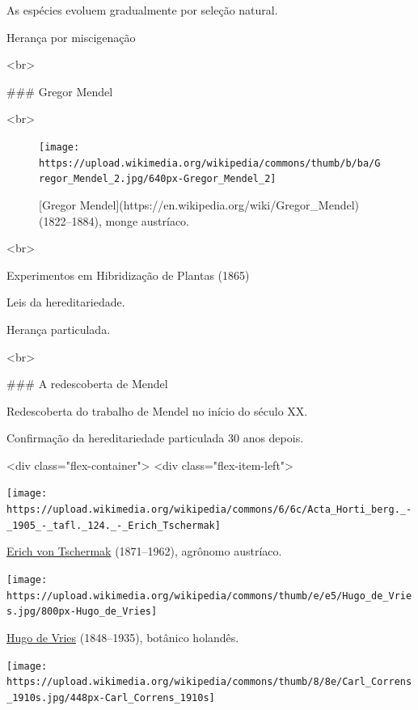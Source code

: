 \documentclass[
]{book}
\begin{document}
As espécies evoluem gradualmente por seleção natural.

Herança por miscigenação

<br> 

### Gregor Mendel

<br>

\begin{figure}

\hfill{}\texttt{[image: https://upload.wikimedia.org/wikipedia/commons/thumb/b/ba/Gregor\_Mendel\_2.jpg/640px-Gregor\_Mendel\_2]} 

\caption{[Gregor Mendel](https://en.wikipedia.org/wiki/Gregor_Mendel) (1822--1884), monge austríaco.}\label{fig:mendel}
\end{figure}

<br>

Experimentos em Hibridização de Plantas (1865)

Leis da hereditariedade. 

Herança particulada.

<br> 

### A redescoberta de Mendel

Redescoberta do trabalho de Mendel no início do século XX.

Confirmação da hereditariedade particulada 30 anos depois.

<div class="flex-container">
  <div class="flex-item-left">

\begin{flushleft}\texttt{[image: https://upload.wikimedia.org/wikipedia/commons/6/6c/Acta\_Horti\_berg.\_-\_1905\_-\_tafl.\_124.\_-\_Erich\_Tschermak]} \end{flushleft}

\href{https://en.wikipedia.org/wiki/Erich_von_Tschermak}{Erich von Tschermak} (1871--1962), agrônomo austríaco.

\begin{flushleft}\texttt{[image: https://upload.wikimedia.org/wikipedia/commons/thumb/e/e5/Hugo\_de\_Vries.jpg/800px-Hugo\_de\_Vries]} \end{flushleft}

\href{https://en.wikipedia.org/wiki/Hugo_de_Vries}{Hugo de Vries} (1848--1935), botânico holandês.

\begin{flushleft}\texttt{[image: https://upload.wikimedia.org/wikipedia/commons/thumb/8/8e/Carl\_Correns\_1910s.jpg/448px-Carl\_Correns\_1910s]} \end{flushleft}
\end{document}
